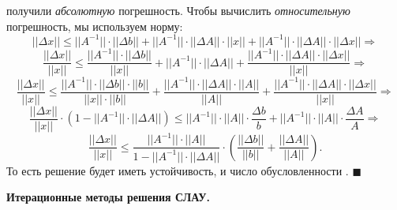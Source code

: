 \documentclass[9pt]{article}
\begin{document}
 получили \textit{абсолютную} погрешность. Чтобы вычислить \textit{относительную} погрешность, мы используем норму:
\[||\Delta x||\le||A^{-1}||\cdot||\Delta b||+||A^{-1}||\cdot||\Delta A||\cdot||x||+||A^{-1}||\cdot||\Delta A||\cdot||\Delta x|| \Rightarrow\]
\[\dfrac{||\Delta x||}{||x||}\le\dfrac{||A^{-1}||\cdot||\Delta b||}{||x||}+||A^{-1}||\cdot||\Delta A||+\dfrac{||A^{-1}||\cdot||\Delta A||\cdot||\Delta x||}{||x||}\Rightarrow\]
\[\dfrac{||\Delta x||}{||x||}\le\dfrac{||A^{-1}||\cdot||\Delta b||\cdot||b||}{||x||\cdot||b||}+\dfrac{||A^{-1}||\cdot||\Delta A||\cdot||A||}{||A||}+\dfrac{||A^{-1}||\cdot||\Delta A||\cdot||\Delta x||}{||x||}\Rightarrow\]
\[\dfrac{||\Delta x||}{||x||}\cdot(1-||A^{-1}||\cdot||\Delta A||)\le||A^{-1}||\cdot||A||\cdot\dfrac{\Delta b}{b}+||A^{-1}||\cdot||A||\cdot\dfrac{\Delta A}{A}\Rightarrow\]
\[\dfrac{||\Delta x||}{||x||}\le\dfrac{||A^{-1}||\cdot||A||}{1-||A^{-1}||\cdot||\Delta A||}\cdot\left(\dfrac{||\Delta b||}{||b||}+\dfrac{||\Delta A||}{||A||}\right).\]
То есть решение будет иметь устойчивость, и число обусловленности . \(\blacksquare\)

\par\textbf{Итерационные методы решения СЛАУ.}
\end{document}
